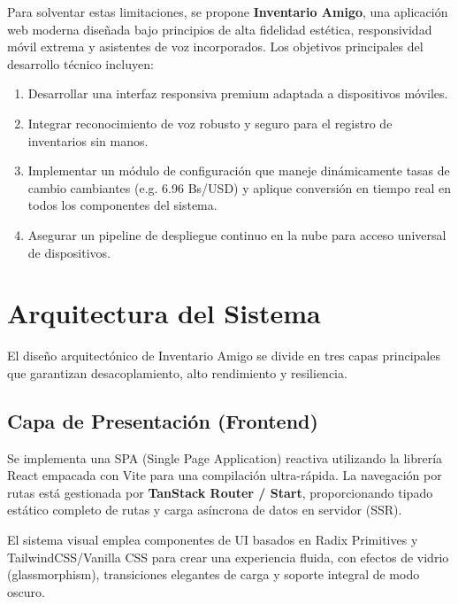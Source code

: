 \documentclass[11pt,a4paper]{article}
\begin{document}
Para solventar estas limitaciones, se propone \textbf{Inventario Amigo}, una aplicación web moderna diseñada bajo principios de alta fidelidad estética, responsividad móvil extrema y asistentes de voz incorporados. Los objetivos principales del desarrollo técnico incluyen:
\begin{enumerate}
    \item Desarrollar una interfaz responsiva premium adaptada a dispositivos móviles.
    \item Integrar reconocimiento de voz robusto y seguro para el registro de inventarios sin manos.
    \item Implementar un módulo de configuración que maneje dinámicamente tasas de cambio cambiantes (e.g. 6.96 Bs/USD) y aplique conversión en tiempo real en todos los componentes del sistema.
    \item Asegurar un pipeline de despliegue continuo en la nube para acceso universal de dispositivos.
\end{enumerate}

\section{Arquitectura del Sistema}
El diseño arquitectónico de Inventario Amigo se divide en tres capas principales que garantizan desacoplamiento, alto rendimiento y resiliencia.

\subsection{Capa de Presentación (Frontend)}
Se implementa una SPA (Single Page Application) reactiva utilizando la librería React empacada con Vite para una compilación ultra-rápida. La navegación por rutas está gestionada por \textbf{TanStack Router / Start}, proporcionando tipado estático completo de rutas y carga asíncrona de datos en servidor (SSR).

El sistema visual emplea componentes de UI basados en Radix Primitives y TailwindCSS/Vanilla CSS para crear una experiencia fluida, con efectos de vidrio (glassmorphism), transiciones elegantes de carga y soporte integral de modo oscuro.
\end{document}
